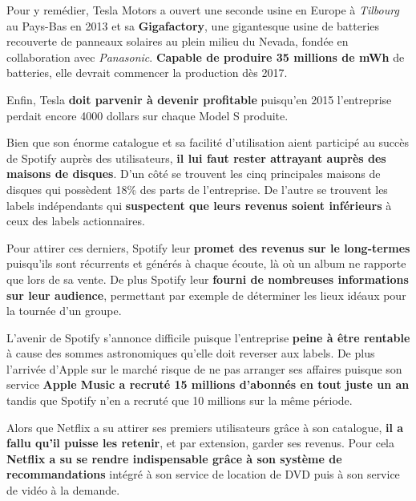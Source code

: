 Pour y remédier, Tesla Motors a ouvert une seconde usine en Europe à \textit{Tilbourg} au Pays-Bas en 2013\supercite{TeslaTilburgFactory} et sa \textbf{Gigafactory}, une gigantesque usine de batteries recouverte de panneaux solaires au plein milieu du Nevada, fondée en collaboration avec \textit{Panasonic}. \textbf{Capable de produire 35 millions de mWh} de batteries, elle devrait commencer la production dès 2017\supercite{Gigafactory}.

Enfin, Tesla \textbf{doit parvenir à devenir profitable} puisqu'en 2015 l'entreprise perdait encore 4000 dollars sur chaque Model S produite\supercite{TeslaLoses}.

\vspace{5mm}

Bien que son énorme catalogue et sa facilité d'utilisation aient participé au succès de Spotify auprès des utilisateurs, \textbf{il lui faut rester attrayant auprès des maisons de disques}. D'un côté se trouvent les cinq principales maisons de disques qui possèdent 18\% des parts de l'entreprise\supercite{LabelsOwnSpotify}. De l'autre se trouvent les labels indépendants qui \textbf{suspectent que leurs revenus soient inférieurs} à ceux des labels actionnaires\supercite{SpotifyBloomberg}.

Pour attirer ces derniers, Spotify leur \textbf{promet des revenus sur le long-termes} puisqu'ils sont récurrents et générés à chaque écoute, là où un album ne rapporte que lors de sa vente. De plus Spotify leur \textbf{fourni de nombreuses informations sur leur audience}, permettant par exemple de déterminer les lieux idéaux pour la tournée d'un groupe.

L'avenir de Spotify s'annonce difficile puisque l'entreprise \textbf{peine à être rentable} à cause des sommes astronomiques qu'elle doit reverser aux labels\supercite{SpotifyChiffres2015}. De plus l'arrivée d'Apple sur le marché risque de ne pas arranger ses affaires puisque son service \textbf{Apple Music a recruté 15 millions d'abonnés en tout juste un an}\supercite{AppleMusic15Million} tandis que Spotify n'en a recruté que 10 millions sur la même période.

\vspace{5mm}

Alors que Netflix a su attirer ses premiers utilisateurs grâce à son catalogue, \textbf{il a fallu qu'il puisse les retenir}, et par extension, garder ses revenus. Pour cela\textbf{ Netflix a su se rendre indispensable grâce à son système de recommandations} intégré à son service de location de DVD puis à son service de vidéo à la demande.

